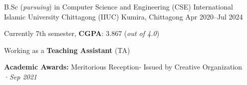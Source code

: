 

\begin{cventries}

  \cventry
    {B.Sc (\textit{pursuing}) in Computer Science and Engineering (CSE)} %
    {International Islamic University Chittagong (IIUC)} %
    { Kumira, Chittagong} %
    {Apr 2020–Jul 2024} %
    {
      \begin{cvitems} %
        \item {Currently 7th semester, \textbf{CGPA}: 3.867 (\textit{out of 4.0})}
        \item {Working as a \textbf{Teaching Assistant }(TA)}
        \item {\textbf{Academic Awards:} Meritorious Reception- Issued by Creative Organization ·\textit{Sep 2021}}
      \end{cvitems}
    }
    
    
\end{cventries}

